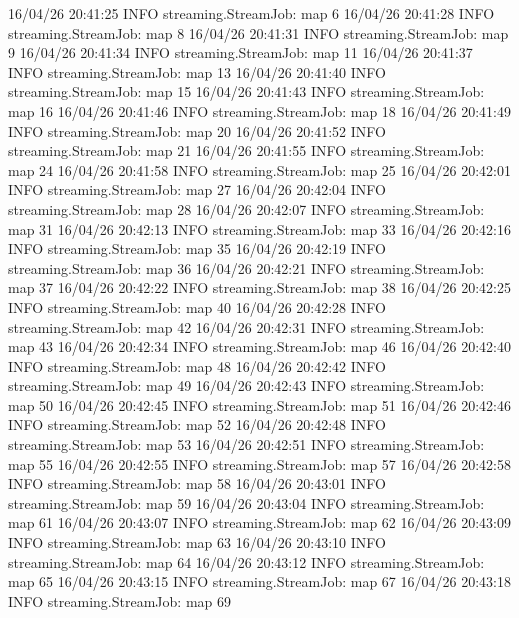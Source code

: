 16/04/26 20:41:25 INFO streaming.StreamJob:  map 6%
16/04/26 20:41:28 INFO streaming.StreamJob:  map 8%
16/04/26 20:41:31 INFO streaming.StreamJob:  map 9%
16/04/26 20:41:34 INFO streaming.StreamJob:  map 11%
16/04/26 20:41:37 INFO streaming.StreamJob:  map 13%
16/04/26 20:41:40 INFO streaming.StreamJob:  map 15%
16/04/26 20:41:43 INFO streaming.StreamJob:  map 16%
16/04/26 20:41:46 INFO streaming.StreamJob:  map 18%
16/04/26 20:41:49 INFO streaming.StreamJob:  map 20%
16/04/26 20:41:52 INFO streaming.StreamJob:  map 21%
16/04/26 20:41:55 INFO streaming.StreamJob:  map 24%
16/04/26 20:41:58 INFO streaming.StreamJob:  map 25%
16/04/26 20:42:01 INFO streaming.StreamJob:  map 27%
16/04/26 20:42:04 INFO streaming.StreamJob:  map 28%
16/04/26 20:42:07 INFO streaming.StreamJob:  map 31%
16/04/26 20:42:13 INFO streaming.StreamJob:  map 33%
16/04/26 20:42:16 INFO streaming.StreamJob:  map 35%
16/04/26 20:42:19 INFO streaming.StreamJob:  map 36%
16/04/26 20:42:21 INFO streaming.StreamJob:  map 37%
16/04/26 20:42:22 INFO streaming.StreamJob:  map 38%
16/04/26 20:42:25 INFO streaming.StreamJob:  map 40%
16/04/26 20:42:28 INFO streaming.StreamJob:  map 42%
16/04/26 20:42:31 INFO streaming.StreamJob:  map 43%
16/04/26 20:42:34 INFO streaming.StreamJob:  map 46%
16/04/26 20:42:40 INFO streaming.StreamJob:  map 48%
16/04/26 20:42:42 INFO streaming.StreamJob:  map 49%
16/04/26 20:42:43 INFO streaming.StreamJob:  map 50%
16/04/26 20:42:45 INFO streaming.StreamJob:  map 51%
16/04/26 20:42:46 INFO streaming.StreamJob:  map 52%
16/04/26 20:42:48 INFO streaming.StreamJob:  map 53%
16/04/26 20:42:51 INFO streaming.StreamJob:  map 55%
16/04/26 20:42:55 INFO streaming.StreamJob:  map 57%
16/04/26 20:42:58 INFO streaming.StreamJob:  map 58%
16/04/26 20:43:01 INFO streaming.StreamJob:  map 59%
16/04/26 20:43:04 INFO streaming.StreamJob:  map 61%
16/04/26 20:43:07 INFO streaming.StreamJob:  map 62%
16/04/26 20:43:09 INFO streaming.StreamJob:  map 63%
16/04/26 20:43:10 INFO streaming.StreamJob:  map 64%
16/04/26 20:43:12 INFO streaming.StreamJob:  map 65%
16/04/26 20:43:15 INFO streaming.StreamJob:  map 67%
16/04/26 20:43:18 INFO streaming.StreamJob:  map 69%
